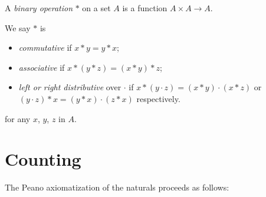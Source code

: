 \documentclass{../template/note}
\begin{document}
    \begin{definition}
        A \emph{binary operation} \(*\) on a set \(A\) is a function \(A \times A \to A\).

        We say \(*\) is
        \begin{itemize}
            \item \emph{commutative} if \(x * y = y * x\);
            \item \emph{associative} if \(x * (y * z) = (x * y) * z\);
            \item \emph{left or right distributive} over \(\cdot\) if \(x * (y \cdot z) = (x * y) \cdot (x * z)\) or \((y \cdot z) * x = (y * x) \cdot (z * x)\) respectively.
        \end{itemize}
        for any \(x\), \(y\), \(z\) in \(A\).
        
    \end{definition}
    
    \section{Counting}

    The Peano axiomatization of the naturals proceeds as follows:
\end{document}
